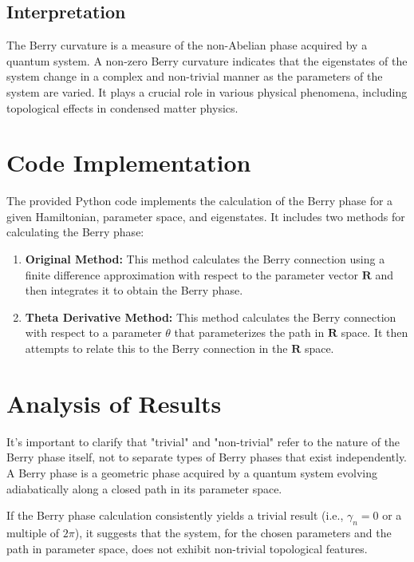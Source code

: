 \documentclass{article}
\begin{document}
\subsection{Interpretation}

The Berry curvature is a measure of the non-Abelian phase acquired by a quantum system. A non-zero Berry curvature indicates that the eigenstates of the system change in a complex and non-trivial manner as the parameters of the system are varied. It plays a crucial role in various physical phenomena, including topological effects in condensed matter physics.

\section{Code Implementation}

The provided Python code implements the calculation of the Berry phase for a given Hamiltonian, parameter space, and eigenstates. It includes two methods for calculating the Berry phase:

\begin{enumerate}
    \item  \textbf{Original Method:} This method calculates the Berry connection using a finite difference approximation with respect to the parameter vector $\mathbf{R}$ and then integrates it to obtain the Berry phase.
    \item  \textbf{Theta Derivative Method:} This method calculates the Berry connection with respect to a parameter $\theta$ that parameterizes the path in $\mathbf{R}$ space. It then attempts to relate this to the Berry connection in the $\mathbf{R}$ space.
\end{enumerate}

\section{Analysis of Results}

It's important to clarify that "trivial" and "non-trivial" refer to the nature of the Berry phase itself, not to separate types of Berry phases that exist independently. A Berry phase is a geometric phase acquired by a quantum system evolving adiabatically along a closed path in its parameter space. \cite{berry1984}

If the Berry phase calculation consistently yields a trivial result (i.e., $\gamma_n = 0$ or a multiple of $2\pi$), it suggests that the system, for the chosen parameters and the path in parameter space, does not exhibit non-trivial topological features.
\end{document}
